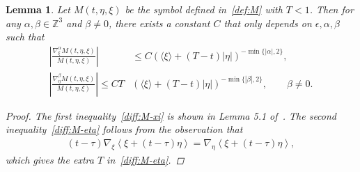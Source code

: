 \documentclass[11pt,american, reqno]{amsart}
\numberwithin{equation}{section}
\newtheorem{lemma}[theorem]{Lemma}
\newcommand{\1}{\mathds{1}}
\newcommand{\la}{\langle}
\newcommand{\ra}{\rangle}
\newcommand{\ZZ}{{\mathbb{Z}}}
\newcommand{\Eps}{\epsilon}
\newcommand{\abs}[1]{\left\vert#1\right\vert}
\newcommand{\vint}[1]{\left\langle#1\right\rangle}
\numberwithin{equation}{section}
\begin{document}
\begin{lemma}\label{lem:deriv-M}
Let $M(t,\eta, \xi)$ be the symbol defined in~\eqref{def:M} with $T < 1$. Then for any $\alpha, \beta \in \ZZ^3$ and $\beta \neq 0$, there exists a constant $C$ that only depends on $\Eps, \alpha, \beta$ such that
\begin{align}
\abs{\frac{\nabla_\xi^\alpha  M(t, \eta, \xi)}{M(t, \eta, \xi)}}
&\leq C
 (\la \xi \ra  + (T-t) |\eta| )^{-\min\{|\alpha|, 2\}}, \label{diff:M-xi}
\\
\abs{\frac{\nabla_\eta^\beta  M(t, \eta, \xi)}{M(t, \eta, \xi)} }
\leq C T
& (\la \xi \ra  + (T-t) |\eta| )^{-\min\{|\beta|, 2\}},
\qquad \beta \neq 0.
\label{diff:M-eta}
\end{align}
\begin{proof}
The first inequality~\eqref{diff:M-xi} is shown in Lemma 5.1 of~\cite{AMSY2020}. The second inequality~\eqref{diff:M-eta} follows from the observation that
\begin{align*}
 (t - \tau) \nabla_\xi \vint{\xi + (t - \tau) \eta}
= \nabla_\eta \vint{\xi + (t - \tau) \eta},
\end{align*}
which gives the extra $T$ in~\eqref{diff:M-eta}.
\end{proof}

\end{lemma}
\end{document}

